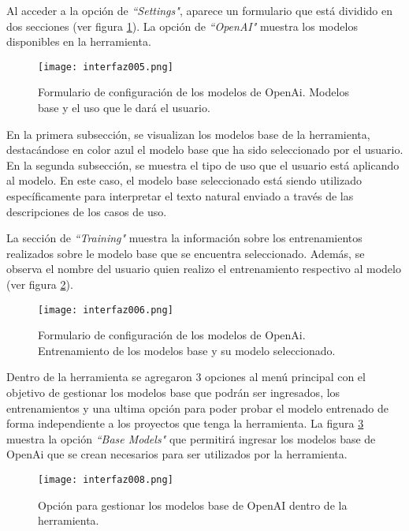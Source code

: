 Al acceder a la opción de \textit{``Settings"}, aparece un formulario que está dividido en dos secciones (ver figura \ref{fig:cap3_interfaz_005}). La opción de \textit{``OpenAI"} muestra los modelos disponibles en la herramienta. 

\begin{figure}[H]  
\centering
\texttt{[image: interfaz005.png]} 
\caption{Formulario de configuración de los modelos de OpenAi. Modelos base y el uso que le dará el usuario.}
\label{fig:cap3_interfaz_005}
\end{figure}

En la primera subsección, se visualizan los modelos base de la herramienta, destacándose en color azul el modelo base que ha sido seleccionado por el usuario. En la segunda subsección, se muestra el tipo de uso que el usuario está aplicando al modelo. En este caso, el modelo base seleccionado está siendo utilizado específicamente para interpretar el texto natural enviado a través de las descripciones de los casos de uso.

La sección de \textit{``Training"} muestra la información sobre los entrenamientos realizados sobre le modelo base que se encuentra seleccionado. Además, se observa el nombre del usuario quien realizo el entrenamiento respectivo al modelo (ver figura \ref{fig:cap3_interfaz_006}).

\begin{figure}[H]  
 	\centering
 	\texttt{[image: interfaz006.png]} 
 	\caption{Formulario de configuración de los modelos de OpenAi. Entrenamiento de los modelos base y su modelo seleccionado.}
 	\label{fig:cap3_interfaz_006}
\end{figure}

Dentro de la herramienta se agregaron 3 opciones al menú principal con el objetivo de gestionar los modelos base que podrán ser ingresados, los entrenamientos y una ultima opción para poder probar el modelo entrenado de forma independiente a los proyectos que tenga la herramienta. La figura \ref{fig:cap3_interfaz_008} muestra la opción \textit{``Base Models"} que permitirá ingresar los modelos base de OpenAi que se crean necesarios para ser utilizados por la herramienta.

\begin{figure}[H]  
	\centering
	\texttt{[image: interfaz008.png]} 
	\caption{Opción para gestionar los modelos base de OpenAI dentro de la herramienta.}
	\label{fig:cap3_interfaz_008}
\end{figure}

